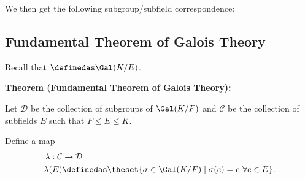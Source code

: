 We then get the following subgroup/subfield correspondence:

\begin{center}

\end{center}

\hypertarget{fundamental-theorem-of-galois-theory}{%
\subsection{Fundamental Theorem of Galois
Theory}\label{fundamental-theorem-of-galois-theory}}

Recall that \(\definedas \Gal(K/E)\).

\textbf{Theorem (Fundamental Theorem of Galois Theory):}

Let \(\mathcal D\) be the collection of subgroups of \(\Gal(K/F)\) and
\(\mathcal C\) be the collection of subfields \(E\) such that
\(F \leq E \leq K\).

Define a map \begin{align*}
\lambda: \mathcal C &\to \mathcal D \\
\lambda(E) &\definedas \theset{\sigma \in \Gal(K/F) \mid \sigma(e) = e ~\forall e\in E}
.\end{align*}

